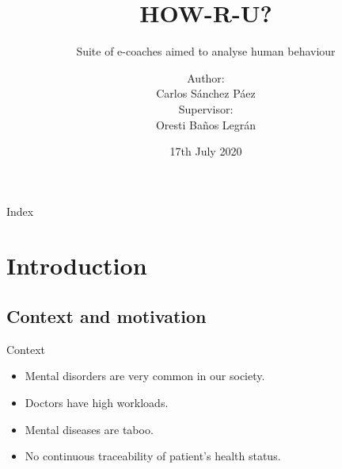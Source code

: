 \documentclass{beamer}
\title{HOW-R-U?}
\date{17th July 2020}
\subtitle{Suite of e-coaches aimed to analyse human behaviour}
\author{Author:\\Carlos Sánchez Páez\\Supervisor:\\Oresti Baños Legrán}
\begin{document}
\centering
\begin{frame}
 \titlepage
\end{frame}

\begin{frame}{Index}
 \tableofcontents
\end{frame}

\section{Introduction}
\subsection{Context and motivation}
\begin{frame}[fragile]{Context}
  \begin{itemize}[<+->]
    \item Mental disorders are very common in our society.
    \item Doctors have high workloads.
    \item Mental diseases are taboo.
    \item No continuous traceability of patient's health status.
  \end{itemize}
\end{frame}
\end{document}
